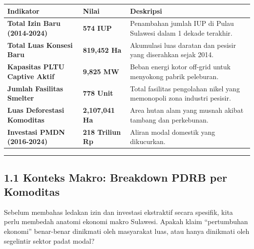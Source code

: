 \documentclass[
]{article}
\newcounter{none} %
\begin{document}
{\def\LTcaptype{none} %
\begin{longtable}[]{@{}
  >{\raggedright\arraybackslash}p{}
  >{\raggedright\arraybackslash}p{}
  >{\raggedright\arraybackslash}p{}@{}}
\toprule\noalign{}
\begin{minipage}[b]{\linewidth}\raggedright
Indikator
\end{minipage} & \begin{minipage}[b]{\linewidth}\raggedright
Nilai
\end{minipage} & \begin{minipage}[b]{\linewidth}\raggedright
Deskripsi
\end{minipage} \\
\midrule\noalign{}
\endhead
\bottomrule\noalign{}
\endlastfoot
\textbf{Total Izin Baru (2014-2024)} & \textbf{574 IUP} & Penambahan
jumlah IUP di Pulau Sulawesi dalam 1 dekade terakhir. \\
\textbf{Total Luas Konsesi Baru} & \textbf{819,452 Ha} & Akumulasi luas
daratan dan pesisir yang diserahkan sejak 2014. \\
\textbf{Kapasitas PLTU Captive Aktif} & \textbf{9,825 MW} & Beban energi
kotor off-grid untuk menyokong pabrik peleburan. \\
\textbf{Jumlah Fasilitas Smelter} & \textbf{778 Unit} & Total fasilitas
pengolahan nikel yang memonopoli zona industri pesisir. \\
\textbf{Luas Deforestasi Komoditas} & \textbf{2,107,041 Ha} & Area hutan
alam yang musnah akibat tambang dan perkebunan. \\
\textbf{Investasi PMDN (2016-2024)} & \textbf{218 Triliun Rp} & Aliran
modal domestik yang dikucurkan. \\
\end{longtable}
}

\begin{center}\rule{0.5\linewidth}{0.5pt}\end{center}

\subsection{1.1 Konteks Makro: Breakdown PDRB per
Komoditas}\label{konteks-makro-breakdown-pdrb-per-komoditas}

Sebelum membahas ledakan izin dan investasi ekstraktif secara spesifik,
kita perlu membedah anatomi ekonomi makro Sulawesi. Apakah klaim
``pertumbuhan ekonomi'' benar-benar dinikmati oleh masyarakat luas, atau
hanya dinikmati oleh segelintir sektor padat modal?
\end{document}
